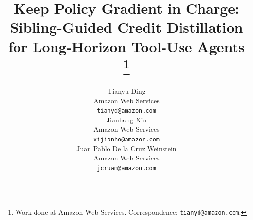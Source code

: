 \documentclass[11pt]{article}
\title{Keep Policy Gradient in Charge: Sibling-Guided Credit Distillation
       for Long-Horizon Tool-Use Agents
       \thanks{Work done at Amazon Web Services. Correspondence:
       \texttt{tianyd@amazon.com}.}}
\author{
  Tianyu Ding \\
  Amazon Web Services \\
  \texttt{tianyd@amazon.com} \\\And
  Jianhong Xin \\
  Amazon Web Services \\
  \texttt{xijianho@amazon.com} \\\And
  Juan Pablo De la Cruz Weinstein \\
  Amazon Web Services \\
  \texttt{jcruam@amazon.com} \\
}
\begin{document}
\maketitle

\begin{abstract}

\end{abstract}
















\end{document}
